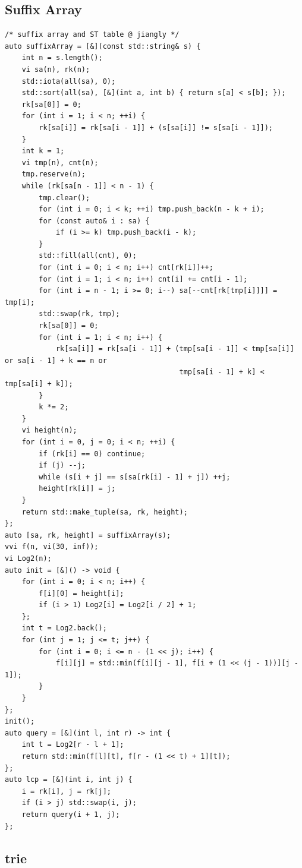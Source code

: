 \documentclass[UTF8, a4paper, titlepage, twoside]{ctexart}
\begin{document}
\subsection{ Suffix Array }
\begin{lstlisting}[style=cpp]
/* suffix array and ST table @ jiangly */
auto suffixArray = [&](const std::string& s) {
    int n = s.length();
    vi sa(n), rk(n);
    std::iota(all(sa), 0);
    std::sort(all(sa), [&](int a, int b) { return s[a] < s[b]; });
    rk[sa[0]] = 0;
    for (int i = 1; i < n; ++i) {
        rk[sa[i]] = rk[sa[i - 1]] + (s[sa[i]] != s[sa[i - 1]]);
    }
    int k = 1;
    vi tmp(n), cnt(n);
    tmp.reserve(n);
    while (rk[sa[n - 1]] < n - 1) {
        tmp.clear();
        for (int i = 0; i < k; ++i) tmp.push_back(n - k + i);
        for (const auto& i : sa) {
            if (i >= k) tmp.push_back(i - k);
        }
        std::fill(all(cnt), 0);
        for (int i = 0; i < n; i++) cnt[rk[i]]++;
        for (int i = 1; i < n; i++) cnt[i] += cnt[i - 1];
        for (int i = n - 1; i >= 0; i--) sa[--cnt[rk[tmp[i]]]] = tmp[i];
        std::swap(rk, tmp);
        rk[sa[0]] = 0;
        for (int i = 1; i < n; i++) {
            rk[sa[i]] = rk[sa[i - 1]] + (tmp[sa[i - 1]] < tmp[sa[i]] or sa[i - 1] + k == n or
                                         tmp[sa[i - 1] + k] < tmp[sa[i] + k]);
        }
        k *= 2;
    }
    vi height(n);
    for (int i = 0, j = 0; i < n; ++i) {
        if (rk[i] == 0) continue;
        if (j) --j;
        while (s[i + j] == s[sa[rk[i] - 1] + j]) ++j;
        height[rk[i]] = j;
    }
    return std::make_tuple(sa, rk, height);
};
auto [sa, rk, height] = suffixArray(s);
vvi f(n, vi(30, inf));
vi Log2(n);
auto init = [&]() -> void {
    for (int i = 0; i < n; i++) {
        f[i][0] = height[i];
        if (i > 1) Log2[i] = Log2[i / 2] + 1;
    };
    int t = Log2.back();
    for (int j = 1; j <= t; j++) {
        for (int i = 0; i <= n - (1 << j); i++) {
            f[i][j] = std::min(f[i][j - 1], f[i + (1 << (j - 1))][j - 1]);
        }
    }
};
init();
auto query = [&](int l, int r) -> int {
    int t = Log2[r - l + 1];
    return std::min(f[l][t], f[r - (1 << t) + 1][t]);
};
auto lcp = [&](int i, int j) {
    i = rk[i], j = rk[j];
    if (i > j) std::swap(i, j);
    return query(i + 1, j);
};
\end{lstlisting}

\subsection{ trie }
\end{document}
